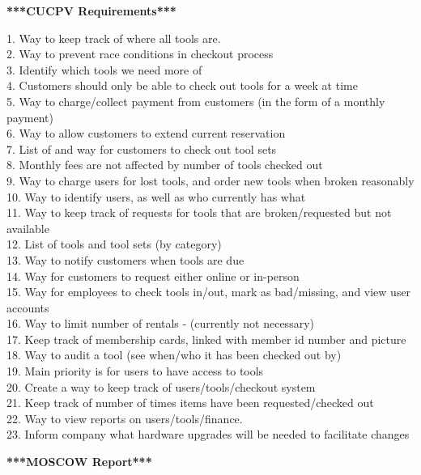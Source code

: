 \documentclass[12pt,letterpaper]{article}
\begin{document}
\newpage
\textbf{***CUCPV Requirements***}

1. Way to keep track of where all tools are.\\
2. Way to prevent race conditions in checkout process\\
3. Identify which tools we need more of\\
4. Customers should only be able to check out tools for a week at time\\
5. Way to charge/collect payment from customers (in the form of a monthly payment)\\
6. Way to allow customers to extend current reservation\\
7. List of and way for customers to check out tool sets\\
8. Monthly fees are not affected by number of tools checked out\\
9. Way to charge users for lost tools, and order new tools when broken reasonably\\
10. Way to identify users, as well as who currently has what\\
11. Way to keep track of requests for tools that are broken/requested but not available\\
12. List of tools and tool sets (by category)\\
13. Way to notify customers when tools are due\\
14. Way for customers to request either online or in-person\\
15. Way for employees to check tools in/out, mark as bad/missing, and view user accounts\\
16. Way to limit number of rentals - (currently not necessary)\\
17. Keep track of membership cards, linked with member id number and picture\\
18. Way to audit a tool (see when/who it has been checked out by)\\
19. Main priority is for users to have access to tools\\
20. Create a way to keep track of users/tools/checkout system\\
21. Keep track of number of times items have been requested/checked out\\
22. Way to view reports on users/tools/finance.\\
23. Inform company what hardware upgrades will be needed to facilitate changes

\newpage
\textbf{***MOSCOW Report***}
\end{document}
